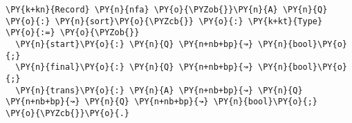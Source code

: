 \begin{Verbatim}[commandchars=\\\{\}]
\PY{k+kn}{Record} \PY{n}{nfa} \PY{o}{\PYZob{}}\PY{n}{A} \PY{n}{Q} \PY{o}{:} \PY{n}{sort}\PY{o}{\PYZcb{}} \PY{o}{:} \PY{k+kt}{Type} \PY{o}{:=} \PY{o}{\PYZob{}}
  \PY{n}{start}\PY{o}{:} \PY{n}{Q} \PY{n+nb+bp}{↝} \PY{n}{bool}\PY{o}{;}
  \PY{n}{final}\PY{o}{:} \PY{n}{Q} \PY{n+nb+bp}{↝} \PY{n}{bool}\PY{o}{;}
  \PY{n}{trans}\PY{o}{:} \PY{n}{A} \PY{n+nb+bp}{↝} \PY{n}{Q} \PY{n+nb+bp}{↝} \PY{n}{Q} \PY{n+nb+bp}{↝} \PY{n}{bool}\PY{o}{;}
\PY{o}{\PYZcb{}}\PY{o}{.}
\end{Verbatim}
